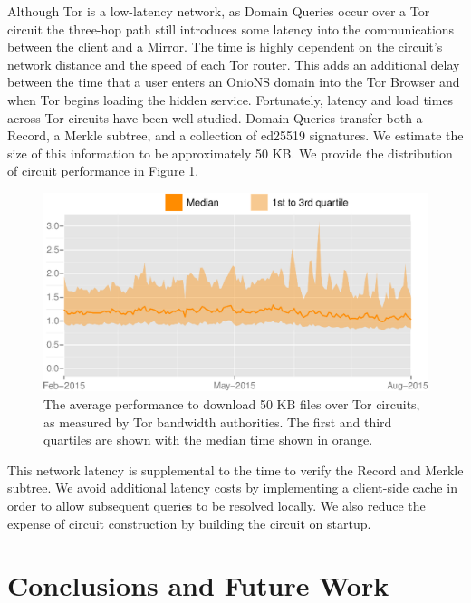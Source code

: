 \documentclass[conference]{IEEEtran}
\begin{document}
Although Tor is a low-latency network, as Domain Queries occur over a Tor circuit the three-hop path still introduces some latency into the communications between the client and a Mirror. The time is highly dependent on the circuit's network distance and the speed of each Tor router. This adds an additional delay between the time that a user enters an OnioNS domain into the Tor Browser and when Tor begins loading the hidden service. Fortunately, latency and load times across Tor circuits have been well studied. Domain Queries transfer both a Record, a Merkle subtree, and a collection of ed25519 signatures. We estimate the size of this information to be approximately 50 KB. We provide the distribution of circuit performance in Figure \ref{fig:latencyGraph}.

\begin{figure}[h]
	\centering
	\includegraphics[width=\linewidth]{../assets/images/torperf_50kb_2015-02_2015-08.eps}
	\caption{The average performance to download 50 KB files over Tor circuits, as measured by Tor bandwidth authorities. The first and third quartiles are shown with the median time shown in orange\cite{TorMetrics}.}
	\label{fig:latencyGraph}
\end{figure}

This network latency is supplemental to the time to verify the Record and Merkle subtree. We avoid additional latency costs by implementing a client-side cache in order to allow subsequent queries to be resolved locally. We also reduce the expense of circuit construction by building the circuit on startup.

\section{Conclusions and Future Work}
\end{document}
